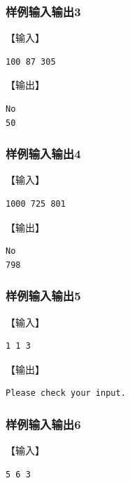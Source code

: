 \documentclass{article}
\begin{document}
\subsubsection{样例输入输出3}

【输入】

\begin{lstlisting}[language={bash},
    basicstyle=\small\consolas]
100 87 305
\end{lstlisting}

【输出】

\begin{lstlisting}[language={bash},
    basicstyle=\small\consolas]
No
50
\end{lstlisting}

\subsubsection{样例输入输出4}

【输入】

\begin{lstlisting}[language={bash},
    basicstyle=\small\consolas]
1000 725 801
\end{lstlisting}

【输出】

\begin{lstlisting}[language={bash},
    basicstyle=\small\consolas]
No
798
\end{lstlisting}

\subsubsection{样例输入输出5}

【输入】

\begin{lstlisting}[language={bash},
    basicstyle=\small\consolas]
1 1 3
\end{lstlisting}

【输出】

\begin{lstlisting}[language={bash},
    basicstyle=\small\consolas]
Please check your input.
\end{lstlisting}

\subsubsection{样例输入输出6}

【输入】

\begin{lstlisting}[language={bash},
    basicstyle=\small\consolas]
5 6 3
\end{lstlisting}
\end{document}
